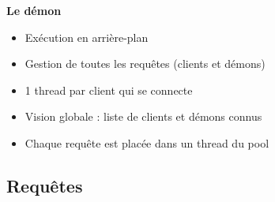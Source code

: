 \documentclass{beamer}
\begin{document}
\begin{frame}
    \textbf{Le démon}
    
    \begin{itemize}
        \item Exécution en arrière-plan
        \item Gestion de toutes les requêtes (clients et démons)
        \item 1 thread par client qui se connecte
        \item Vision globale : liste de clients et démons connus
        \item Chaque requête est placée dans un thread du pool
    \end{itemize}
\end{frame}

\begin{frame}
    \section{Requêtes}
\end{frame}
\end{document}
